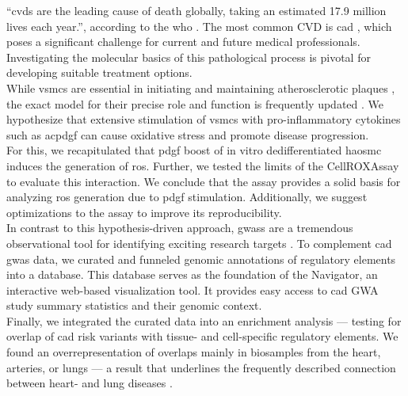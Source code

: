 “\Acp{cvd} are the leading cause of death globally, taking an estimated 17.9 million lives each year.”, according to the \ac{who} \cite{whoCardiovascularDiseases2022}. The most common CVD is \ac{cad} \cite{centersfordiseasecontrolandpreventionHeartDiseaseFacts2022}, which poses a significant challenge for current and future medical professionals. Investigating the molecular basics of this pathological process is pivotal for developing suitable treatment options.\\
While \acp{vsmc} are essential in initiating and maintaining atherosclerotic plaques \cite{doranRoleSmoothMuscle2008}, the exact model for their precise role and function is frequently updated \cite{liuSmoothMuscleCell2019, grootaertVascularSmoothMuscle2021, yapSixShadesVascular2021}. We hypothesize that extensive stimulation of \acp{vsmc} with pro-inflammatory cytokines such as ac{pdgf} can cause oxidative stress and promote disease progression.\\
For this, we recapitulated that \acs{pdgf} boost of in vitro dedifferentiated \ac{haosmc} induces the generation of \ac{ros}. Further, we tested the limits of the CellROX\texttrademark Assay to evaluate this interaction. We conclude that the assay provides a solid basis for analyzing \ac{ros} generation due to \ac{pdgf} stimulation. Additionally, we suggest optimizations to the assay to improve its reproducibility.\\
In contrast to this hypothesis-driven approach, \acp{gwas} are a tremendous observational tool for identifying exciting research targets \cite{uffelmannGenomewideAssociationStudies2021}. To complement \ac{cad} \ac{gwas} data, we curated and funneled genomic annotations of regulatory elements into a database. This database serves as the foundation of the  Navigator, an interactive web-based visualization tool. It provides easy access to \ac{cad}  GWA study summary statistics and their genomic context.\\
Finally, we integrated the curated data into an enrichment analysis — testing for overlap of \ac{cad} risk variants with tissue- and cell-specific regulatory elements. We found an overrepresentation of overlaps mainly in biosamples from the heart, arteries, or lungs — a result that underlines the frequently described connection between heart- and lung diseases \cite{carterAssociationCardiovascularDisease2019, nowakLungFunctionCoronary2018, hanPulmonaryDiseasesHeart2007}.

